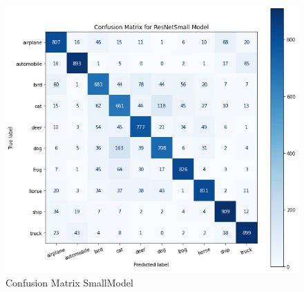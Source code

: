 \documentclass[letterpaper]{article} %
\begin{document}
\begin{figure}[htbp]
\captionsetup[subfigure]{justification=centering}
  \centering
  \includegraphics[scale = 0.4]{image/con_small.png}
  \caption{Confusion Matrix SmallModel}
\end{figure}
\end{document}

